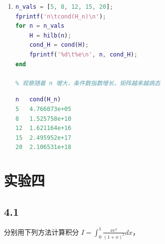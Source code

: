 \begin{enumerate}
\begin{lstlisting}[language=matlab]
残差 norm(Ax - b) 为：
         0.041404213307586
\end{lstlisting}
    \item
\begin{lstlisting}[language=matlab]
% 计算 Hilbert 矩阵及其条件数
n_vals = [5, 8, 12, 15, 20];
fprintf('n\tcond(H_n)\n');
for n = n_vals
    H = hilb(n);
    cond_H = cond(H);
    fprintf('%d\t%e\n', n, cond_H);
end

% 观察随着 n 增大，条件数指数增长，矩阵越来越病态
\end{lstlisting}
\begin{lstlisting}[language=matlab]
n	cond(H_n)
5	4.766073e+05
8	1.525758e+10
12	1.621164e+16
15	2.495952e+17
20	2.106531e+18
\end{lstlisting}
\end{enumerate}
\section{实验四}
\subsection*{4.1}
分别用下列方法计算积分 $I = \int_0^1 \frac{xe^x}{(1+x)^2} dx$，

